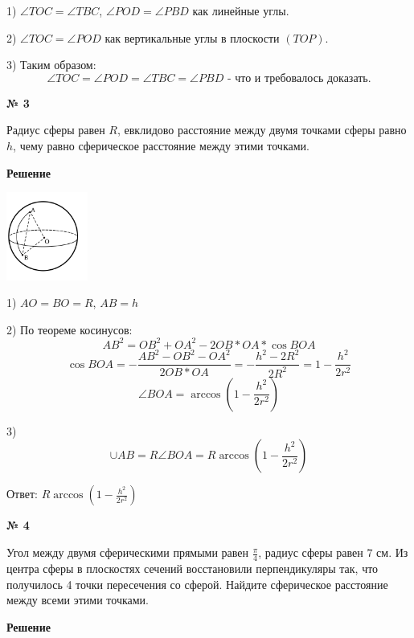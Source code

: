     1) $\angle TOC = \angle TBC$, $\angle POD = \angle PBD$ как линейные углы.

    2) $\angle TOC = \angle POD$ как вертикальные углы в плоскости $(TOP)$.

    3) Таким образом:
    \[
        \angle TOC = \angle POD = \angle TBC = \angle PBD \text{ - что и требовалось доказать.}
    \]

    \begin{center}
        \textbf{№ 3}
    \end{center}

    Радиус сферы равен $R$, евклидово расстояние между двумя точками сферы равно $h$,
    чему равно сферическое расстояние между этими точками.

    \textbf{Решение}\\

    \begin{center}
        \includegraphics[width=0.2\textwidth]{images/img6}\\
    \end{center}

    1) $AO = BO = R$, $AB = h$

    2) По теореме косинусов:
    \[
        AB ^ 2 = OB ^ 2 + OA ^ 2 - 2OB*OA*\cos BOA
    \]
    \[
        \cos BOA = -\frac{AB^2 - OB^2 - OA^2}{2OB*OA} = -\frac{h^2 - 2R^2}{2R^2} = 1 - \frac{h^2}{2r^2}
    \]
    \[
        \angle BOA = \arccos \left(1 - \frac{h^2}{2r^2}\right)
    \]

    3)
    \[
        \cup AB = R\angle BOA = R \arccos \left(1 - \frac{h^2}{2r^2}\right)
    \]

    Ответ: $R \arccos \left(1 - \frac{h^2}{2r^2}\right)$

    \begin{center}
        \textbf{№ 4}
    \end{center}

    Угол между двумя сферическими прямыми равен $\frac{\pi}{4}$, радиус сферы равен $7$ см.
    Из центра сферы в плоскостях сечений восстановили перпендикуляры так, что получилось 4 точки пересечения со сферой.
    Найдите сферическое расстояние между всеми этими точками.

    \textbf{Решение}\\

